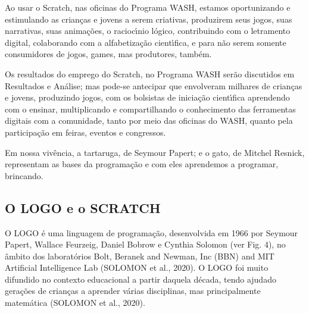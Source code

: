 \documentclass[
12pt,		%
openright,	%
twoside,  %
a4paper,			%
chapter=TITLE,		%
english,			%
french,				%
spanish,			%
brazil				%
]{USPSC-classe/USPSC}
\begin{document}
Ao usar o Scratch, nas oficinas do Programa WASH, estamos oportunizando e estimulando \textquotedbl as crian\c{c}as e jovens a serem criativas, produzirem seus jogos, suas narrativas, suas anima\c{c}\~oes, o racioc\'{\i}nio l\'ogico, contribuindo com o letramento digital, colaborando com a alfabetiza\c{c}\~ao cient\'{\i}fica, e para n\~ao serem somente consumidores de jogos, games, mas produtores, tamb\'em\textquotedbl .








Os resultados do emprego do Scratch, no Programa WASH ser\~ao discutidos em Resultados e An\'alise; mas pode-se antecipar que envolveram milhares de crian\c{c}as e jovens, produzindo jogos, com os bolsistas de inicia\c{c}\~ao cient\'{\i}fica aprendendo com o ensinar, multiplicando e compartilhando o conhecimento das ferramentas digitais  com a comunidade, tanto por meio das oficinas do WASH, quanto pela participa\c{c}\~ao em feiras, eventos e congressos.








Em nossa viv\^encia, a tartaruga, de Seymour Papert; e o gato, de Mitchel Resnick,  representam as bases da  programa\c{c}\~ao e com eles aprendemos a  programar, brincando.








\subsection[O LOGO e o SCRATCH]{O LOGO e o SCRATCH}\label{O LOGO e o SCRATCH}
O LOGO \'e uma linguagem de programa\c{c}\~ao, desenvolvida em 1966 por Seymour Papert, Wallace Feurzeig, Daniel Bobrow e Cynthia Solomon (ver Fig. 4), no \^ambito dos laborat\'orios Bolt, Beranek and Newman, Inc (BBN) and MIT Artificial Intelligence Lab (SOLOMON et al., 2020). O LOGO foi muito difundido no contexto educacional a partir daquela d\'ecada, tendo ajudado gera\c{c}\~oes de crian\c{c}as a aprender v\'arias disciplinas, mas principalmente matem\'atica  (SOLOMON et al., 2020).
\end{document}
